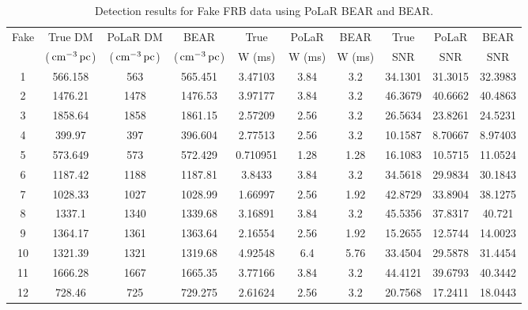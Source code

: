 \begin{table}
    \centering
    \caption[Detection results for fake FRB data]{Detection results for Fake FRB data using PoLaR BEAR and BEAR.}
    \tiny
    \def\arraystretch{1.25}
    \begin{tabular}{cccccccccc}
    \hline
      Fake  &  True DM  &  PoLaR DM  &  BEAR  &  True  &  PoLaR   &  BEAR  &  True  &  PoLaR  &  BEAR  \\
      & ($\,\text{cm}^{-3}\,\text{pc}$) & ($\,\text{cm}^{-3}\,\text{pc}$) & ($\,\text{cm}^{-3}\,\text{pc}$) & W (ms) & W (ms) & W (ms) & SNR & SNR & SNR \\
    \hline
       1   &  566.158  &       563       &  565.451  & 3.47103  &      3.84      &   3.2    &  34.1301   &     31.3015      &  32.3983   \\
       2   &  1476.21  &      1478       &  1476.53  & 3.97177  &      3.84      &   3.2    &  46.3679   &     40.6662      &  40.4863   \\
       3   &  1858.64  &      1858       &  1861.15  & 2.57209  &      2.56      &   3.2    &  26.5634   &     23.8261      &  24.5231   \\
       4   &  399.97   &       397       &  396.604  & 2.77513  &      2.56      &   3.2    &  10.1587   &     8.70667      &  8.97403   \\
       5   &  573.649  &       573       &  572.429  & 0.710951 &      1.28      &   1.28   &  16.1083   &     10.5715      &  11.0524   \\
       6   &  1187.42  &      1188       &  1187.81  &  3.8433  &      3.84      &   3.2    &  34.5618   &     29.9834      &  30.1843   \\
       7   &  1028.33  &      1027       &  1028.99  & 1.66997  &      2.56      &   1.92   &  42.8729   &     33.8904      &  38.1275   \\
       8   &  1337.1   &      1340       &  1339.68  & 3.16891  &      3.84      &   3.2    &  45.5356   &     37.8317      &   40.721   \\
       9   &  1364.17  &      1361       &  1363.64  & 2.16554  &      2.56      &   1.92   &  15.2655   &     12.5744      &  14.0023   \\
      10   &  1321.39  &      1321       &  1319.68  & 4.92548  &      6.4       &   5.76   &  33.4504   &     29.5878      &  31.4454   \\
      11   &  1666.28  &      1667       &  1665.35  & 3.77166  &      3.84      &   3.2    &  44.4121   &     39.6793      &  40.3442   \\
      12   &  728.46   &       725       &  729.275  & 2.61624  &      2.56      &   3.2    &  20.7568   &     17.2411      &  18.0443   \\

\end{tabular}
\end{table}
